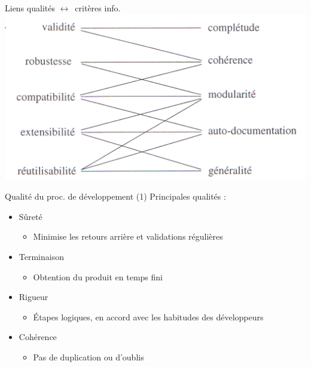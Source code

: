 \documentclass[14pt]{beamer}
\begin{document}
\begin{framentitle}{Liens qualités $\leftrightarrow$\ critères info.}
    \includegraphics[width=\textwidth]{fig5.png}
\end{framentitle}

\begin{framentitle}{Qualité du proc. de développement (1)}
    Principales qualités :
    \begin{itemize}
        \item Sûreté
            \begin{itemize}
                \item Minimise les retours arrière et validations
                    régulières
            \end{itemize}
        \item Terminaison
            \begin{itemize}
                \item Obtention du produit en temps fini
            \end{itemize}
        \item Rigueur
            \begin{itemize}
                \item Étapes logiques, en accord avec les habitudes des
                    développeurs
            \end{itemize}
        \item Cohérence
            \begin{itemize}
                \item Pas de duplication ou d'oublis
            \end{itemize}
    \end{itemize}
\end{framentitle}
\end{document}
